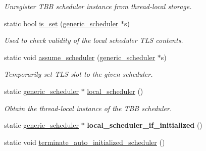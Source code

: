 \begin{DoxyCompactItemize}
\begin{DoxyCompactList}\small\item\em Unregister T\+B\+B scheduler instance from thread-\/local storage. \end{DoxyCompactList}\item 
\hypertarget{classtbb_1_1internal_1_1governor_a051887474589f34ffab66e5c2602ccf2}{}static bool \hyperlink{classtbb_1_1internal_1_1governor_a051887474589f34ffab66e5c2602ccf2}{is\+\_\+set} (\hyperlink{classtbb_1_1internal_1_1generic__scheduler}{generic\+\_\+scheduler} $\ast$s)\label{classtbb_1_1internal_1_1governor_a051887474589f34ffab66e5c2602ccf2}

\begin{DoxyCompactList}\small\item\em Used to check validity of the local scheduler T\+L\+S contents. \end{DoxyCompactList}\item 
\hypertarget{classtbb_1_1internal_1_1governor_a1d703dd39300b259f99c5440db8b8895}{}static void \hyperlink{classtbb_1_1internal_1_1governor_a1d703dd39300b259f99c5440db8b8895}{assume\+\_\+scheduler} (\hyperlink{classtbb_1_1internal_1_1generic__scheduler}{generic\+\_\+scheduler} $\ast$s)\label{classtbb_1_1internal_1_1governor_a1d703dd39300b259f99c5440db8b8895}

\begin{DoxyCompactList}\small\item\em Temporarily set T\+L\+S slot to the given scheduler. \end{DoxyCompactList}\item 
static \hyperlink{classtbb_1_1internal_1_1generic__scheduler}{generic\+\_\+scheduler} $\ast$ \hyperlink{classtbb_1_1internal_1_1governor_af2d5dff302cbba60bcf7becbdce2ade9}{local\+\_\+scheduler} ()
\begin{DoxyCompactList}\small\item\em Obtain the thread-\/local instance of the T\+B\+B scheduler. \end{DoxyCompactList}\item 
\hypertarget{classtbb_1_1internal_1_1governor_a1ee92969cca6e52c74ce6534bca69cb7}{}static \hyperlink{classtbb_1_1internal_1_1generic__scheduler}{generic\+\_\+scheduler} $\ast$ {\bfseries local\+\_\+scheduler\+\_\+if\+\_\+initialized} ()\label{classtbb_1_1internal_1_1governor_a1ee92969cca6e52c74ce6534bca69cb7}

\item 
\hypertarget{classtbb_1_1internal_1_1governor_a6af77e18ae7d56899162c01ee982deef}{}static void \hyperlink{classtbb_1_1internal_1_1governor_a6af77e18ae7d56899162c01ee982deef}{terminate\+\_\+auto\+\_\+initialized\+\_\+scheduler} ()\label{classtbb_1_1internal_1_1governor_a6af77e18ae7d56899162c01ee982deef}


\end{DoxyCompactItemize}
